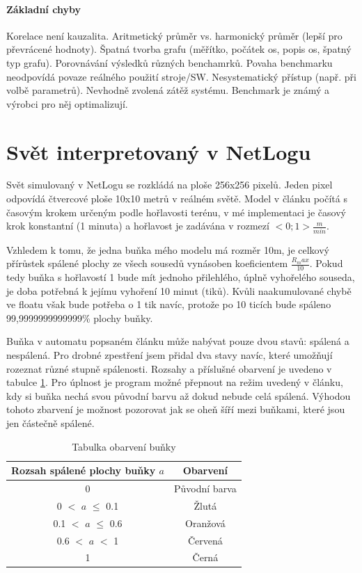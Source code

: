 \documentclass[11pt,a4paper]{scrartcl}
\begin{document}
	
	\paragraph{Základní chyby} Korelace není kauzalita. Aritmetický průměr vs. harmonický průměr (lepší pro převrácené hodnoty). Špatná tvorba grafu (měřítko, počátek os, popis os, špatný typ grafu). Porovnávání výsledků různých benchamrků. Povaha benchmarku neodpovídá povaze reálného použití stroje/SW. Nesystematický přístup (např. při volbě parametrů). Nevhodně zvolená zátěž systému. Benchmark je známý a výrobci pro něj optimalizují.
	
	\section{Svět interpretovaný v NetLogu}
	Svět simulovaný v NetLogu se rozkládá na ploše 256x256 pixelů. Jeden pixel odpovídá čtvercové ploše 10x10 metrů v reálném světě. Model v článku počítá s časovým krokem určeným podle hořlavosti terénu, v mé implementaci je časový krok konstantní (1 minuta) a hořlavost je zadávána v rozmezí $<0;1> \frac{m}{min}$. 
	
	Vzhledem k tomu, že jedna buňka mého modelu má rozměr 10m, je celkový přírůstek spálené plochy ze všech sousedů vynásoben koeficientem $\frac{R_max}{10}$. Pokud tedy buňka s hořlavostí 1 bude mít jednoho přilehlého, úplně vyhořelého souseda, je doba potřebná k jejímu vyhoření 10 minut (tiků). Kvůli naakumulované chybě ve floatu však bude potřeba o 1 tik navíc, protože po 10 ticích bude spáleno 99,9999999999999\% plochy buňky.
	
	Buňka v automatu popsaném článku může nabývat pouze dvou stavů: spálená a nespálená. Pro drobné zpestření jsem přidal dva stavy navíc, které umožňují rozeznat různé stupně spálenosti. Rozsahy a příslušné obarvení je uvedeno v tabulce \ref{tab:patch-color}. Pro úplnost je program možné přepnout na režim uvedený v článku, kdy si buňka nechá svou původní barvu až dokud nebude celá spálená. Výhodou tohoto zbarvení je možnost pozorovat jak se oheň šíří mezi buňkami, které jsou jen částečně spálené.
	
	\begin{table}[H]
		\centering
		\begin{tabular}{|c|c|}
			\hline
			Rozsah spálené plochy buňky $a$ & Obarvení \\
			\hline
			\hline
			0 & Původní barva \\
			\hline
			0 $<$ $a$ $\le$ 0.1 & Žlutá \\
			\hline
			0.1 $<$ $a$ $\le$ 0.6 & Oranžová \\
			\hline
			0.6 $<$ $a$ $<$ 1 & Červená \\
			\hline
			1 & Černá \\
			\hline 
		\end{tabular}
		\caption{Tabulka obarvení buňky}
		\label{tab:patch-color}
	\end{table}
	
\end{document}
